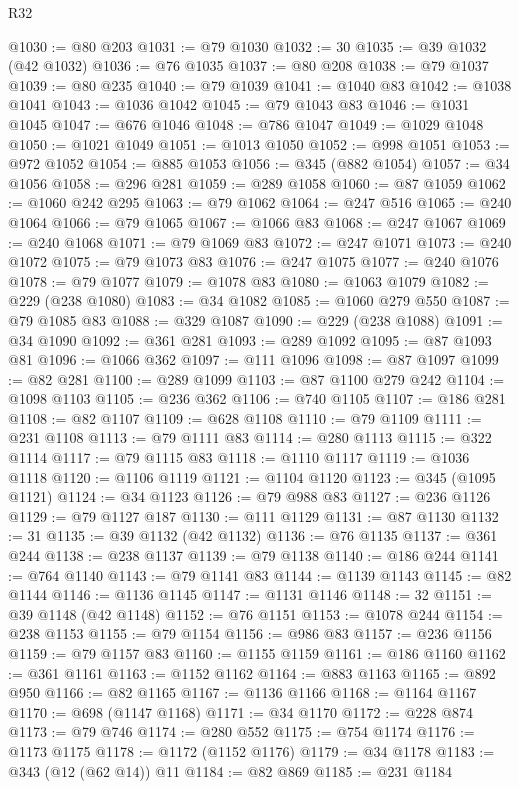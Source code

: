 \begin{lexlean}{R32}
\begin{coremodule}
@1030 := @80 @203
@1031 := @79 @1030
@1032 := 30
@1035 := @39 @1032 (@42 @1032)
@1036 := @76 @1035
@1037 := @80 @208
@1038 := @79 @1037
@1039 := @80 @235
@1040 := @79 @1039
@1041 := @1040 @83
@1042 := @1038 @1041
@1043 := @1036 @1042
@1045 := @79 @1043 @83
@1046 := @1031 @1045
@1047 := @676 @1046
@1048 := @786 @1047
@1049 := @1029 @1048
@1050 := @1021 @1049
@1051 := @1013 @1050
@1052 := @998 @1051
@1053 := @972 @1052
@1054 := @885 @1053
@1056 := @345 (@882 @1054)
@1057 := @34 @1056
@1058 := @296 @281
@1059 := @289 @1058
@1060 := @87 @1059
@1062 := @1060 @242 @295
@1063 := @79 @1062
@1064 := @247 @516
@1065 := @240 @1064
@1066 := @79 @1065
@1067 := @1066 @83
@1068 := @247 @1067
@1069 := @240 @1068
@1071 := @79 @1069 @83
@1072 := @247 @1071
@1073 := @240 @1072
@1075 := @79 @1073 @83
@1076 := @247 @1075
@1077 := @240 @1076
@1078 := @79 @1077
@1079 := @1078 @83
@1080 := @1063 @1079
@1082 := @229 (@238 @1080)
@1083 := @34 @1082
@1085 := @1060 @279 @550
@1087 := @79 @1085 @83
@1088 := @329 @1087
@1090 := @229 (@238 @1088)
@1091 := @34 @1090
@1092 := @361 @281
@1093 := @289 @1092
@1095 := @87 @1093 @81
@1096 := @1066 @362
@1097 := @111 @1096
@1098 := @87 @1097
@1099 := @82 @281
@1100 := @289 @1099
@1103 := @87 @1100 @279 @242
@1104 := @1098 @1103
@1105 := @236 @362
@1106 := @740 @1105
@1107 := @186 @281
@1108 := @82 @1107
@1109 := @628 @1108
@1110 := @79 @1109
@1111 := @231 @1108
@1113 := @79 @1111 @83
@1114 := @280 @1113
@1115 := @322 @1114
@1117 := @79 @1115 @83
@1118 := @1110 @1117
@1119 := @1036 @1118
@1120 := @1106 @1119
@1121 := @1104 @1120
@1123 := @345 (@1095 @1121)
@1124 := @34 @1123
@1126 := @79 @988 @83
@1127 := @236 @1126
@1129 := @79 @1127 @187
@1130 := @111 @1129
@1131 := @87 @1130
@1132 := 31
@1135 := @39 @1132 (@42 @1132)
@1136 := @76 @1135
@1137 := @361 @244
@1138 := @238 @1137
@1139 := @79 @1138
@1140 := @186 @244
@1141 := @764 @1140
@1143 := @79 @1141 @83
@1144 := @1139 @1143
@1145 := @82 @1144
@1146 := @1136 @1145
@1147 := @1131 @1146
@1148 := 32
@1151 := @39 @1148 (@42 @1148)
@1152 := @76 @1151
@1153 := @1078 @244
@1154 := @238 @1153
@1155 := @79 @1154
@1156 := @986 @83
@1157 := @236 @1156
@1159 := @79 @1157 @83
@1160 := @1155 @1159
@1161 := @186 @1160
@1162 := @361 @1161
@1163 := @1152 @1162
@1164 := @883 @1163
@1165 := @892 @950
@1166 := @82 @1165
@1167 := @1136 @1166
@1168 := @1164 @1167
@1170 := @698 (@1147 @1168)
@1171 := @34 @1170
@1172 := @228 @874
@1173 := @79 @746
@1174 := @280 @552
@1175 := @754 @1174
@1176 := @1173 @1175
@1178 := @1172 (@1152 @1176)
@1179 := @34 @1178
@1183 := @343 (@12 (@62 @14)) @11
@1184 := @82 @869
@1185 := @231 @1184

\end{coremodule}
\end{lexlean}
